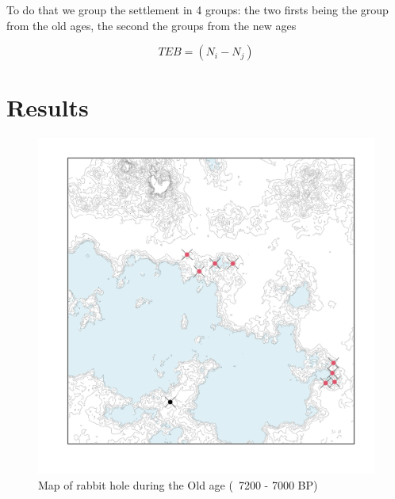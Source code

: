 \documentclass[10pt]{paper}
\begin{document}
To do that we group the settlement in 4 groups: the two firsts being the group from the old ages, the second the groups from the new ages 



\begin{equation}
    TEB= \left( N_i - N_j\right)
\end{equation}

\pagebreak

\section{Results}

\begin{figure}
    \centering
    \includegraphics[width=.65\textwidth]{oldages}
    \caption{Map of rabbit hole during the Old age (~7200 - 7000 BP)  }
    \label{fig:allage}
\end{figure}
\end{document}

